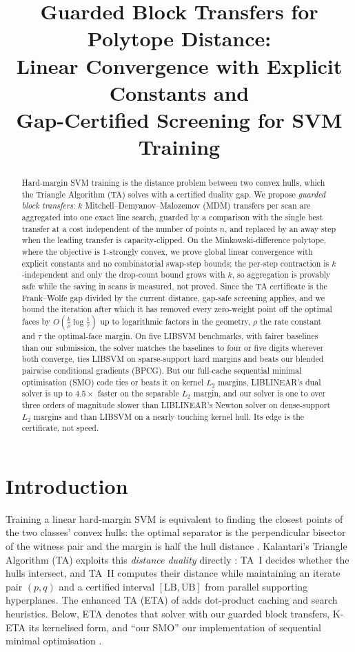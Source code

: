 \documentclass{opt2026}   %
\title[Guarded Block Transfers for Polytope Distance]{Guarded Block Transfers for Polytope Distance:\\
Linear Convergence with Explicit Constants and\\
Gap-Certified Screening for SVM Training}
\newcommand{\UB}{\mathrm{UB}}
\newcommand{\LB}{\mathrm{LB}}
\begin{document}
\maketitle

\begin{abstract}
Hard-margin SVM training is the distance problem between two convex
hulls, which the Triangle Algorithm (TA) solves with a certified
duality gap. We propose \emph{guarded block transfers}: $k$
Mitchell--Demyanov--Malozemov (MDM) transfers per scan are aggregated
into one exact line search, guarded by a comparison with the single
best transfer at a cost independent of the number of points $n$, and replaced by an away
step when the leading transfer is capacity-clipped. On the
Minkowski-difference polytope, where the objective is $1$-strongly
convex, we prove global linear convergence with explicit constants and
no combinatorial swap-step bounds; the per-step contraction is
$k$-independent and only the drop-count bound grows with $k$, so
aggregation is provably safe while the saving in scans is measured, not
proved. Since the TA certificate is the
Frank--Wolfe gap divided by the current distance, gap-safe screening
applies, and we bound the iteration after which it has removed every
zero-weight point off the optimal faces by $O\!\left(\tfrac{k}{\rho}\log\tfrac{1}{\tau}\right)$
up to logarithmic factors in the geometry, $\rho$ the rate constant and
$\tau$ the optimal-face margin. On five LIBSVM benchmarks, with fairer baselines than our submission,
the solver matches the baselines to four or five digits wherever both
converge, ties LIBSVM on sparse-support hard margins and beats our
blended pairwise conditional gradients (BPCG). But our full-cache
sequential minimal optimisation (SMO) code ties or beats it on kernel
$L_2$ margins, LIBLINEAR's dual solver is up to $4.5\times$ faster on the
separable $L_2$ margin, and our solver is one to over three orders of magnitude slower than
LIBLINEAR's Newton solver on dense-support $L_2$
margins and than LIBSVM on a nearly touching kernel hull. Its edge is
the certificate, not speed.
\end{abstract}

\section{Introduction}

Training a linear hard-margin SVM is equivalent to finding the closest
points of the two classes' convex hulls: the optimal separator is the
perpendicular bisector of the witness pair and the margin is half the
hull distance \cite{bennett2000duality}. Kalantari's Triangle Algorithm
(TA) exploits this \emph{distance duality} directly \cite{kalantari2015}:
TA~I decides whether the hulls intersect, and TA~II computes their
distance while maintaining an iterate pair $(p,q)$ and a certified
interval $[\LB,\UB]$ from parallel supporting hyperplanes. The enhanced
TA (ETA) of
\cite{gupta2026} adds dot-product caching and search heuristics. Below,
ETA denotes that solver with our guarded block transfers, K-ETA its
kernelised form, and ``our SMO'' our implementation of sequential
minimal optimisation \cite{platt1998}.
\end{document}
